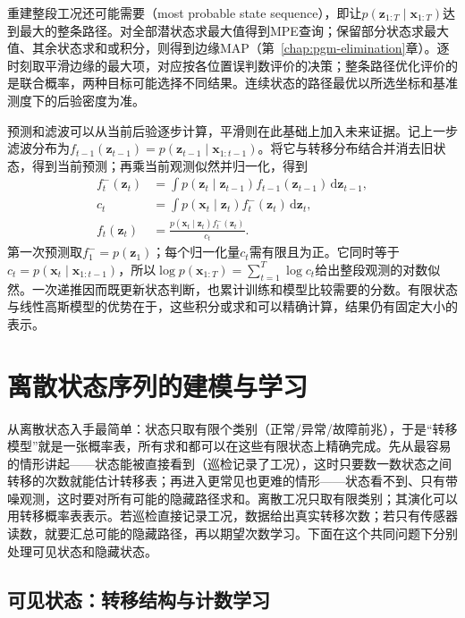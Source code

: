 重建整段工况还可能需要（most probable state sequence），即让$p(\bm{z}_{1:T}\mid\bm{x}_{1:T})$达到最大的整条路径。对全部潜状态求最大值得到MPE查询；保留部分状态求最大值、其余状态求和或积分，则得到边缘MAP（第~\ref{chap:pgm-elimination}章）。逐时刻取平滑边缘的最大项，对应按各位置误判数评价的决策；整条路径优化评价的是联合概率，两种目标可能选择不同结果。连续状态的路径最优以所选坐标和基准测度下的后验密度为准。

预测和滤波可以从当前后验逐步计算，平滑则在此基础上加入未来证据。记上一步滤波分布为$f_{t-1}(\bm{z}_{t-1})=p(\bm{z}_{t-1}\mid\bm{x}_{1:t-1})$。将它与转移分布结合并消去旧状态，得到当前预测；再乘当前观测似然并归一化，得到
\begin{equation}
  \begin{aligned}
    f_t^{-}(\bm{z}_t)
      &=\int p(\bm{z}_t\mid\bm{z}_{t-1})
        f_{t-1}(\bm{z}_{t-1})\,\mathrm{d}\bm{z}_{t-1},\\
    c_t
      &=\int p(\bm{x}_t\mid\bm{z}_t)
        f_t^{-}(\bm{z}_t)\,\mathrm{d}\bm{z}_t,\\
    f_t(\bm{z}_t)
      &=\frac{p(\bm{x}_t\mid\bm{z}_t)
        f_t^{-}(\bm{z}_t)}{c_t}.
  \end{aligned}
  \label{eq:pgm-dynamic-bayes-filter}
\end{equation}
第一次预测取$f_1^{-}=p(\bm{z}_1)$；每个归一化量$c_t$需有限且为正。它同时等于$c_t=p(\bm{x}_t\mid\bm{x}_{1:t-1})$，所以$\log p(\bm{x}_{1:T})=\sum_{t=1}^{T}\log c_t$给出整段观测的对数似然。一次递推因而既更新状态判断，也累计训练和模型比较需要的分数。有限状态与线性高斯模型的优势在于，这些积分或求和可以精确计算，结果仍有固定大小的表示。

\section{离散状态序列的建模与学习}
\label{sec:pgm-dynamic-discrete}

从离散状态入手最简单：状态只取有限个类别（正常/异常/故障前兆），于是“转移模型”就是一张概率表，所有求和都可以在这些有限状态上精确完成。先从最容易的情形讲起——状态能被直接看到（巡检记录了工况），这时只要数一数状态之间转移的次数就能估计转移表；再进入更常见也更难的情形——状态看不到、只有带噪观测，这时要对所有可能的隐藏路径求和。离散工况只取有限类别；其演化可以用转移概率表表示。若巡检直接记录工况，数据给出真实转移次数；若只有传感器读数，就要汇总可能的隐藏路径，再以期望次数学习。下面在这个共同问题下分别处理可见状态和隐藏状态。

\subsection{可见状态：转移结构与计数学习}
\label{sec:pgm-dynamic-visible}

